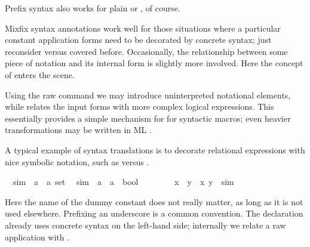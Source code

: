 \begin{isabellebody}
\begin{isamarkuptext}
  Prefix syntax also works for plain  or
  , of course.%
\end{isamarkuptext}%
\isamarkuptrue%
%
\isamarkuptrue%
%
\begin{isamarkuptext}%
Mixfix syntax annotations work well for those situations where a
  particular constant application forms need to be decorated by
  concrete syntax; just reconsider  versus  covered before.  Occasionally, the relationship between some
  piece of notation and its internal form is slightly more involved.
  Here the concept of  enters the scene.

  Using the raw  command we
  may introduce uninterpreted notational elements, while
   relates the input forms with more complex
  logical expressions.  This essentially provides a simple mechanism
  for for syntactic macros; even heavier transformations may be
  written in ML \cite{isabelle-ref}.

  \medskip A typical example of syntax translations is to decorate
  relational expressions with nice symbolic notation, such as  versus .%
\end{isamarkuptext}%
\isamarkuptrue%
\isanewline
\ \ sim\ {\isacharcolon}{\isacharcolon}\ {\isachardoublequote}{\isacharparenleft}{\isacharprime}a\ {\isasymtimes}\ {\isacharprime}a{\isacharparenright}\ set{\isachardoublequote}\isanewline
\isanewline
\isamarkupfalse%
\isanewline
\ \ {\isachardoublequote}{\isacharunderscore}sim{\isachardoublequote}\ {\isacharcolon}{\isacharcolon}\ {\isachardoublequote}{\isacharprime}a\ {\isasymRightarrow}\ {\isacharprime}a\ {\isasymRightarrow}\ bool{\isachardoublequote}\ \ \ \ {\isacharparenleft}\ {\isachardoublequote}{\isasymapprox}{\isachardoublequote}\ {}{}{\isacharparenright}\isanewline
\isamarkupfalse%
\isanewline
\ \ {\isachardoublequote}x\ {\isasymapprox}\ y{\isachardoublequote}\ {\isasymrightleftharpoons}\ {\isachardoublequote}{\isacharparenleft}x{\isacharcomma}\ y{\isacharparenright}\ {\isasymin}\ sim{\isachardoublequote}\isamarkupfalse%
%
\begin{isamarkuptext}%
\noindent Here the name of the dummy constant  does
  not really matter, as long as it is not used elsewhere.  Prefixing
  an underscore is a common convention.  The 
  declaration already uses concrete syntax on the left-hand side;
  internally we relate a raw application  with
  .


\end{isamarkuptext}
\end{isabellebody}
